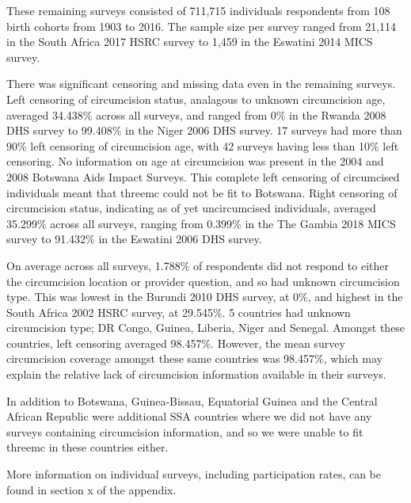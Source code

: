 \documentclass{article}
\begin{document}
These remaining surveys consisted of 711,715 individuals respondents from 108 birth cohorts from 1903 to 2016. The sample size per survey ranged from 21,114 in the South Africa 2017 HSRC survey to 1,459 in the Eswatini 2014 MICS survey.

There was significant censoring and missing data even in the remaining surveys. 
Left censoring of circumcision status, analagous to unknown circumcision age, averaged  34.438\% across all surveys, and ranged from 0\% in the Rwanda 2008 DHS survey to 99.408\% in the Niger 2006 DHS survey.
17 surveys had more than 90\% left censoring of circumcision age, with 42 surveys having less than 10\% left censoring.
No information on age at circumcision was present in the 2004 and 2008 Botswana Aids Impact Surveys. This complete left censoring of circumcised individuals meant that threemc could not be fit to Botswana. 
Right censoring of circumcision status, indicating as of yet uncircumcised individuals, averaged 35.299\% across all surveys, ranging from 0.399\% in the The Gambia 2018 MICS survey to 91.432\% in the Eswatini 2006 DHS survey.

On average across all surveys, 1.788\% of respondents did not respond to either the circumcision location or provider question, and so had unknown circumcision type. 
This was lowest in the Burundi 2010 DHS survey, at 0\%, and highest in the South Africa 2002 HSRC survey, at 29.545\%.
5 countries had unknown circumcision type; DR Congo, Guinea, Liberia, Niger and Senegal. 
Amongst these countries, left censoring averaged 98.457\%. 
However, the mean survey circumcision coverage amongst these same countries was 98.457\%, which may explain the relative lack of circumcision information available in their surveys.

In addition to Botswana, Guinea-Bissau, Equatorial Guinea and the Central African Republic were additional SSA countries where we did not have any surveys containing circumcision information, and so we were unable to fit threemc in these countries either. 

More information on individual surveys, including participation rates, can be found in section x of the appendix. 
\end{document}
